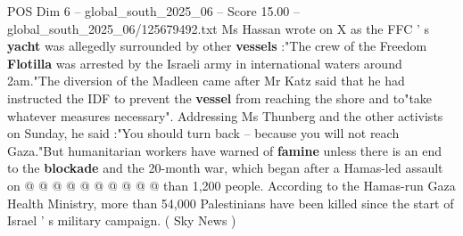 \begin{textsample}{POS Dim 6 – global\_south\_2025\_06 – Score 15.00 – global\_south\_2025\_06/125679492.txt}
Ms Hassan wrote on X as the FFC ' s \textbf{yacht} was allegedly surrounded by other \textbf{vessels} :"The crew of the Freedom \textbf{Flotilla} was arrested by the Israeli army in international waters around 2am."The diversion of the Madleen came after Mr Katz said that he had instructed the IDF to prevent the \textbf{vessel} from reaching the shore and to"take whatever measures necessary".
Addressing Ms Thunberg and the other activists on Sunday, he said :"You should turn back -- because you will not reach Gaza."But humanitarian workers have warned of \textbf{famine} unless there is an end to the \textbf{blockade} and the 20-month war, which began after a Hamas-led assault on @ @ @ @ @ @ @ @ @ @ than 1,200 people.
According to the Hamas-run Gaza Health Ministry, more than 54,000 Palestinians have been killed since the start of Israel ' s military campaign. ( Sky News )

\end{textsample}
